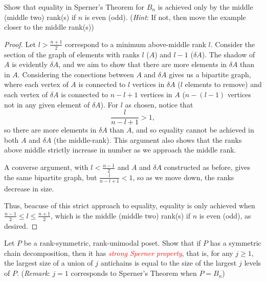 \documentclass[11pt]{scrartcl}
\begin{document}
\begin{problem}[\textcolor{red}{Uniqueness in Sperner's Thm}]
    Show that equality in Sperner's Theorem for $B_n$ is achieved only by the middle (middle two) rank(s) if $n$ is even (odd). (\textit{Hint}: If not, then move the example closer to the middle rank(s))
\end{problem}
\begin{proof}
    Let $l> \frac{n+1}{2}$ correspond to a minimum above-middle rank $l$. Consider the section of the graph of elements with ranks $l$ ($A$) and $l-1$ ($\delta A$). The shadow of $A$ is evidently $\delta A$, and we aim to show that there are more elements in $\delta A$ than in $A$. Considering the conections between $A$ and $\delta A$ gives us a bipartite graph, where each vertex of $A$ is connected to $l$ vertices in $\delta A$ ($l$ elements to remove) and each vertex of $\delta A$ is connected to $n-l+1$ vertices in $A$ ($n-(l-1)$ vertices not in any given element of $\delta A$). For $l$ as chosen, notice that \[\frac{l}{n-l+1}> 1,\] so there are more elements in $\delta A$ than $A$, and so equality cannot be achieved in both $A$ and $\delta A$ (the middle-rank). This argument also shows that the ranks above middle strictly increase in number as we approach the middle rank.

    A converse argument, with $l<\frac{n-1}{2}$ and $A$ and $\delta A$ constructed as before, gives the same bipartite graph, but $\frac{l}{n-l+1}<1$, so as we move down, the ranks decrease in size. 

    Thus, beacuse of this strict approach to equality, equality is only achieved when $\frac{n-1}{2}\leq l\leq \frac{n+1}{2}$, which is the middle (middle two) rank(s) if $n$ is even (odd), as desired.
\end{proof}

\begin{problem}[\textcolor{red}{A generalization of Sperner's Thm}]
    Let $P$ be a rank-symmetric, rank-unimodal poset. Show that if $P$ has a symmetric chain decomposition, then it has \textcolor{red}{\textit{strong Sperner property}}, that is, for any $j\ge 1$, the largest size of a union of $j$ antichains is equal to the size of the largest $j$ levels of $P$. (\textit{Remark}: $j=1$ corresponds to Sperner's Theorem when $P=B_n$)
\end{problem}
\end{document}
